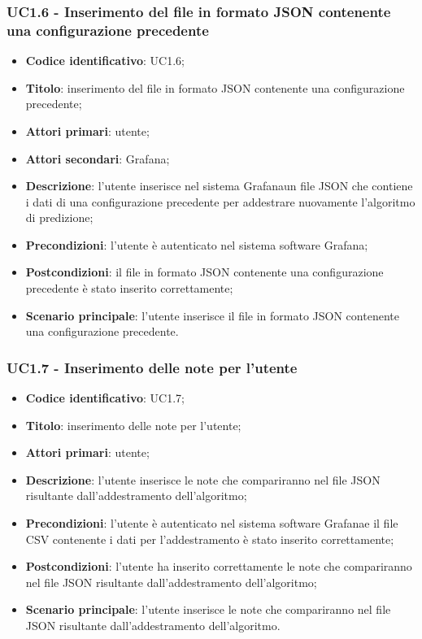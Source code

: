 \subsubsection{UC1.6 - Inserimento del file in formato JSON contenente una configurazione precedente}
\begin{itemize}
	\item \textbf{Codice identificativo}: UC1.6;
	\item \textbf{Titolo}: inserimento del file in formato JSON contenente una configurazione precedente;
	\item \textbf{Attori primari}: utente;
	\item \textbf{Attori secondari}: Grafana\glo;
	\item \textbf{Descrizione}: l'utente inserisce nel sistema Grafana\glosp un file JSON che contiene i dati di una configurazione precedente per addestrare nuovamente l'algoritmo di predizione;
	\item \textbf{Precondizioni}: l'utente è autenticato nel sistema software Grafana\glo;
	\item \textbf{Postcondizioni}: il file in formato JSON contenente una configurazione precedente è stato inserito correttamente;
	\item \textbf{Scenario principale}: l'utente inserisce il file in formato JSON contenente una configurazione precedente.
\end{itemize}
\subsubsection{UC1.7 - Inserimento delle note per l'utente}
\begin{itemize}
	\item \textbf{Codice identificativo}: UC1.7;
	\item \textbf{Titolo}: inserimento delle note per l'utente;
	\item \textbf{Attori primari}: utente;
	\item \textbf{Descrizione}: l'utente inserisce le note che compariranno nel file JSON risultante dall'addestramento dell'algoritmo;
	\item \textbf{Precondizioni}: l'utente è autenticato nel sistema software Grafana\glosp e il file CSV contenente i dati per l'addestramento è stato inserito correttamente;
	\item \textbf{Postcondizioni}: l'utente ha inserito correttamente le note che compariranno nel file JSON risultante dall'addestramento dell'algoritmo;
	\item \textbf{Scenario principale}: l'utente inserisce le note che compariranno nel file JSON risultante dall'addestramento dell'algoritmo.
\end{itemize}
